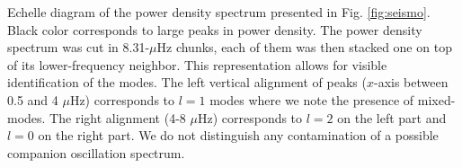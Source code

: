 \label{fig:echelle}  Echelle diagram of the power density spectrum presented in Fig. \ref{fig:seismo}. Black color corresponds to large peaks in power density. The power density spectrum was cut in 8.31-$\mu$Hz chunks, each of them was then stacked one on top of its lower-frequency neighbor. This representation allows for visible identification of the modes. The left vertical alignment of peaks ($x$-axis between 0.5 and 4 $\mu$Hz) corresponds to $l=1$ modes where we note the presence of mixed-modes. The right alignment (4-8 $\mu$Hz) corresponds to $l=2$ on the left part and $l=0$ on the right part. We do not distinguish any contamination of a possible companion oscillation spectrum. 
  
  
  
  
  